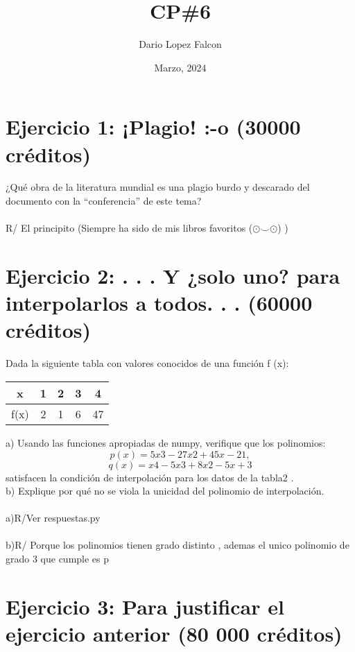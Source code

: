 \documentclass[a4paper,12pt]{article}
\begin{document}
\title{CP\#6}
\author{Dario Lopez Falcon}
\date{Marzo, 2024}
\maketitle
\section*{Ejercicio 1: ¡Plagio! :-o (30000 créditos) }

¿Qué obra de la literatura mundial es una plagio burdo y descarado del documento con la “conferencia” de este tema?\\ \\

R/ El principito (Siempre ha sido de mis libros favoritos ($\odot \smile \odot $) )

\section*{Ejercicio 2: . . . Y ¿solo uno? para interpolarlos a todos. . . (60000 créditos)}

Dada la siguiente tabla con valores conocidos de una función f (x):


\begin{table}[h]
\centering
\begin{tabular}{|c|c|c|c|c|}
\hline
x & 1 & 2 & 3 & 4\\
\hline
f(x) & 2 & 1 & 6 & 47\\
\hline
\end{tabular}
\end{table}

a) Usando las funciones apropiadas de numpy, verifique que los polinomios:
\[p(x) = 5x3 - 27x2 + 45x - 21,\]
\[q(x) = x4 - 5x3 + 8x2 - 5x + 3\]
satisfacen la condición de interpolación para los datos de la tabla2 .\\
b) Explique por qué no se viola la unicidad del polinomio de interpolación.\\\\
a)R/Ver respuestas.py\\\\
b)R/ Porque los polinomios tienen grado distinto , ademas el unico polinomio de grado 3 que cumple es p

\section*{Ejercicio 3: Para justificar el ejercicio anterior (80 000 créditos)}
\end{document}
